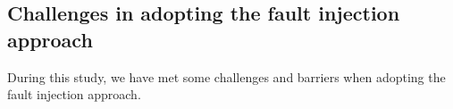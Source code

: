 \subsection{Challenges in adopting the fault injection approach}\label{sec:challenges}
During this study, we have met some challenges and barriers when adopting the fault injection approach. 
%
%


